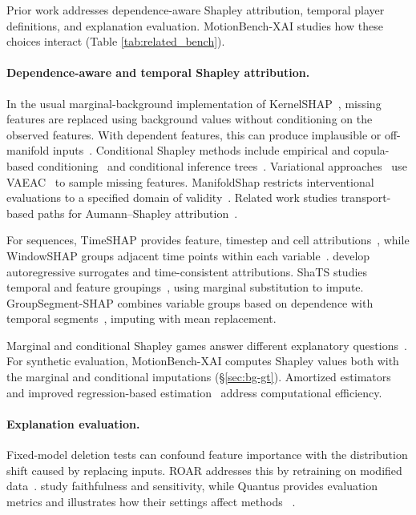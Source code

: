 Prior work addresses dependence-aware Shapley attribution, temporal player definitions, and explanation evaluation. MotionBench-XAI studies how these choices interact (Table \ref{tab:related_bench}).

\paragraph{Dependence-aware and temporal Shapley attribution.}
In the usual marginal-background implementation of
KernelSHAP~\citep{lundberg2017unified}, missing features are replaced using background values without conditioning on the observed features. With dependent features, this can produce implausible or off-manifold
inputs~\citep{frye2021shapley}. Conditional Shapley methods include
empirical and copula-based conditioning~\citep{aas2021explaining,aas2021vineexplaining}
and conditional inference trees~\citep{redelmeier2020explaining}.
Variational approaches~\citep{olsen2022using} use VAEAC~\citep{ivanov2018variational} to sample missing features.
ManifoldShap restricts interventional evaluations to a specified domain of validity~\citep{taufiq2023manifold}. Related work studies transport-based paths for Aumann--Shapley attribution~\citep{zhang2026axiomatic}.

For sequences, TimeSHAP provides feature, timestep and cell
attributions~\citep{bento2021timeshap}, while WindowSHAP groups adjacent
time points within each variable~\citep{NAYEBI2023104438}.
\citet{villani2022feature} develop autoregressive surrogates and
time-consistent attributions. ShaTS studies temporal and feature
groupings~\citep{de2025shats}, using marginal substitution to impute. GroupSegment-SHAP combines variable groups based on dependence with temporal segments~\citep{kim2026groupsegment}, imputing with mean replacement. %

Marginal and conditional Shapley games answer different explanatory
questions~\citep{janzing2020feature,chen2020true,sundararajan2020many,kumar2020problems}. For synthetic evaluation, MotionBench-XAI computes Shapley values both with the marginal and conditional imputations (\S\ref{sec:bg-gt}). Amortized estimators~\citep{jethani2022fastshap} and improved regression-based estimation~\citep{covert2021improving} address computational efficiency.

\paragraph{Explanation evaluation.}
Fixed-model deletion tests can confound feature importance with the
distribution shift caused by replacing inputs. ROAR addresses this by
retraining on modified data~\citep{hooker2019roar}. \citet{bhatt2020evaluating} study faithfulness and sensitivity, while
Quantus provides evaluation metrics and illustrates how their settings
affect methods ~\citep{hedstrom2023quantus}.

